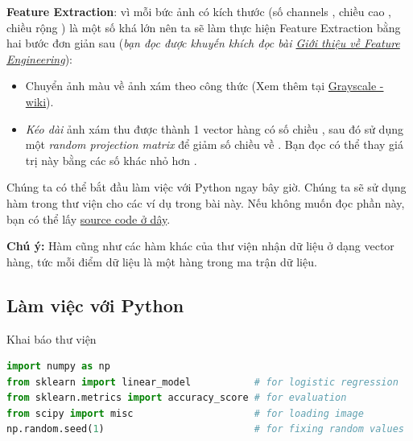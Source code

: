 \textbf{Feature Extraction}: vì mỗi bức ảnh có kích thước  (số channels , chiều cao , chiều rộng ) là một số khá lớn nên ta sẽ làm thực hiện Feature Extraction bằng hai bước đơn giản sau (\textit{bạn đọc được khuyến khích đọc bài \href{http://machinelearningcoban.com/general/2017/02/06/featureengineering/}{Giới thiệu về Feature Engineering}}):  
\begin{itemize}
    \item Chuyển ảnh màu về ảnh xám theo công thức  (Xem thêm tại \href{https://en.wikipedia.org/wiki/Grayscale#Luma_coding_in_video_systems}{Grayscale - wiki}).  
     
    \item \textit{Kéo dài} ảnh xám thu được thành 1 vector hàng có số chiều , sau đó sử dụng một \textit{random projection matrix} để giảm số chiều về . Bạn đọc có thể thay giá trị này bằng các số khác nhỏ hơn .  
\end{itemize}
 
Chúng ta có thể bắt đầu làm việc với Python ngay bây giờ. Chúng ta sẽ sử dụng hàm \href{http://scikit-learn.org/stable/modules/generated/sklearn.linear_model.LogisticRegression.html}{} trong thư viện  cho các ví dụ trong bài này. Nếu không muốn đọc phần này, bạn có thể lấy \href{http://machinelearningcoban.com/assets/LogRegs/ARgender.py}{source code ở dây}.  
 
\textbf{Chú ý:} Hàm \href{http://scikit-learn.org/stable/modules/generated/sklearn.linear_model.LogisticRegression.html}{} cũng như các hàm khác của thư viện  nhận dữ liệu ở dạng vector hàng, tức mỗi điểm dữ liệu là một hàng trong ma trận dữ liệu. 
 
 
\subsection{Làm việc với Python}
 
Khai báo thư viện 
 
\begin{lstlisting}[language=Python]
import numpy as np  
from sklearn import linear_model           # for logistic regression 
from sklearn.metrics import accuracy_score # for evaluation 
from scipy import misc                     # for loading image 
np.random.seed(1)                          # for fixing random values 
\end{lstlisting}
 
